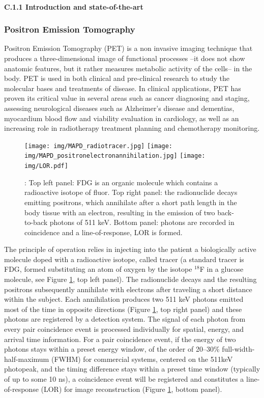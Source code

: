 \\
\noindent\textbf{C.1.1 Introduction and state-of-the-art}

\subsubsection*{Positron Emission Tomography}
Positron Emission Tomography (PET) is a non invasive imaging technique that produces a three-dimensional image of functional processes --it does not show anatomic features, but it rather  measures metabolic activity of the cells-- in the body. PET is used in
both clinical and pre-clinical research to study the molecular bases and treatments of
disease. In clinical applications, PET has proven its critical value in several areas such as
cancer diagnosing and staging, assessing neurological diseases such as Alzheimer's disease
and dementias, myocardium blood flow and viability evaluation in cardiology, as well as an
increasing role in radiotherapy treatment planning and chemotherapy monitoring. 

\begin{figure}[!htb]
	\centering
	\texttt{[image: img/MAPD\_radiotracer.jpg]}
	\texttt{[image: img/MAPD\_positronelectronannihilation.jpg]}
	\texttt{[image: img/LOR.pdf]}
	\caption{\label{fig.fdg}: Top left panel: FDG is an organic molecule which contains a radioactive isotope of fluor. Top right panel: the radionuclide decays emitting positrons, which annihilate after a short path length in the body tissue with an electron, resulting in the emission of two back-to-back photons of 511 keV. Bottom panel: photons are recorded in coincidence and a line-of-response, LOR is formed. }
\end{figure}

The principle of operation relies in injecting into the patient a  
biologically active molecule doped with a radioactive isotope, called tracer (a standard tracer is FDG, formed substituting an atom of oxygen by the isotope \ensuremath{^{18}}F in a glucose molecule, see Figure \ref{fig.fdg}, top left panel). The radionuclide decays and the resulting positrons
subsequently annihilate with electrons after traveling a short distance within the subject.
Each annihilation produces two 511 keV photons emitted most of the time in opposite
directions (Figure \ref{fig.fdg}, top right panel) and these photons are registered by a detection system. The signal of each photon
from every pair coincidence event is processed individually for spatial, energy, and arrival
time information. For a pair coincidence event, if the energy of two photons stays within a
preset energy window, of the order of 20--30\% full-width-half-maximum (FWHM) for commercial systems, centered on the 511keV photopeak, and the timing difference stays within a preset time window (typically of up to some 10 ns), a
coincidence event will be registered and constitutes a line-of-response (LOR) for image
reconstruction (Figure \ref{fig.fdg}, bottom panel).

